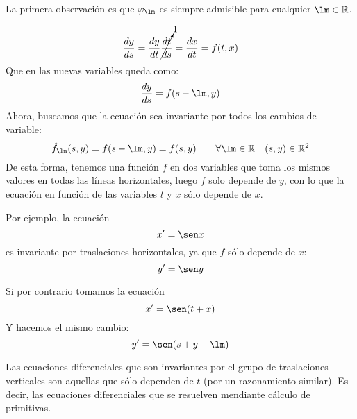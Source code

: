 La primera observación es que $\varphi_\lm$ es siempre admisible para cualquier $\lm \in \mathbb{R}$.

\begin{equation*}
    \dfrac{dy}{ds} = \dfrac{dy}{dt} \cancelto{1}{\dfrac{dt}{ds}} = \dfrac{dx}{dt} = f(t,x)
\end{equation*}
Que en las nuevas variables queda como:
\begin{equation*}
    \dfrac{dy}{ds} = f(s-\lm, y)
\end{equation*}
Ahora, buscamos que la ecuación sea invariante por todos los cambios de variable:
\begin{equation*}
    \hat{f}_\lm (s,y) = f(s-\lm, y) = f(s,y) \qquad \forall \lm \in \mathbb{R} \quad(s,y) \in \mathbb{R}^2
\end{equation*}
De esta forma, tenemos una función $f$ en dos variables que toma los mismos valores en todas las líneas horizontales, luego $f$ solo depende de $y$, con lo que la ecuación en función de las variables $t$ y $x$ sólo depende de $x$.

\begin{ejemplo}
    Por ejemplo, la ecuación
    \begin{equation*}
        x' = \sen x
    \end{equation*}
    es invariante por traslaciones horizontales, ya que $f$ sólo depende de $x$:
    \begin{equation*}
        y' = \sen y
    \end{equation*}
\end{ejemplo}

\begin{ejemplo}
    Si por contrario tomamos la ecuación
    \begin{equation*}
        x' = \sen(t+x)
    \end{equation*}
    Y hacemos el mismo cambio:
    \begin{equation*}
        y' = \sen(s+y-\lm)
    \end{equation*}
\end{ejemplo}

\begin{observacion}
    Las ecuaciones diferenciales que son invariantes por el grupo de traslaciones verticales son aquellas que sólo dependen de $t$ (por un razonamiento similar). Es decir, las ecuaciones diferenciales que se resuelven mendiante cálculo de primitivas.
\end{observacion}

